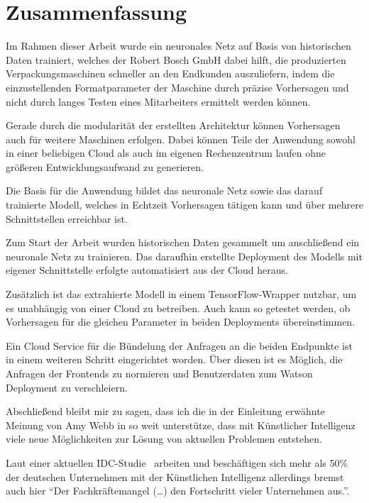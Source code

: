 \chapter{Zusammenfassung}
\label{ch:zusammenfassung}
Im Rahmen dieser Arbeit wurde ein neuronales Netz auf Basis von historischen Daten trainiert, welches der Robert Bosch
GmbH dabei hilft, die produzierten Verpackungsmaschinen schneller an den Endkunden auszuliefern, indem die
einzustellenden Formatparameter der Maschine durch präzise Vorhersagen und nicht durch langes Testen eines Mitarbeiters
ermittelt werden können.

Gerade durch die modularität der erstellten Architektur können Vorhersagen auch für weitere Maschinen erfolgen. Dabei
können Teile der Anwendung sowohl in einer beliebigen Cloud als auch im eigenen Rechenzentrum laufen ohne größeren
Entwicklungsaufwand zu generieren.

Die Basis für die Anwendung bildet das neuronale Netz sowie das darauf trainierte Modell, welches in Echtzeit Vorhersagen
tätigen kann und über mehrere Schnittstellen erreichbar ist.

Zum Start der Arbeit wurden historischen Daten gesammelt um anschließend ein neuronale Netz zu trainieren. Das daraufhin
erstellte Deployment des Modells mit eigener Schnittstelle erfolgte automatisiert aus der Cloud heraus.

Zusätzlich ist das extrahierte Modell in einem TensorFlow-Wrapper nutzbar, um es unabhängig von einer Cloud zu
betreiben. Auch kann so getestet werden, ob Vorhersagen für die gleichen Parameter in beiden Deployments übereinstimmen.

Ein Cloud Service für die Bündelung der Anfragen an die beiden Endpunkte ist in einem weiteren Schritt eingerichtet
worden. Über diesen ist es Möglich, die Anfragen der Frontends zu normieren und Benutzerdaten zum Watson Deployment zu
verschleiern.

Abschließend bleibt mir zu sagen, dass ich die in der Einleitung erwähnte Meinung von Amy Webb in so weit unterstütze,
dass mit Künstlicher Intelligenz viele neue Möglichkeiten zur Lösung von aktuellen Problemen entstehen.

Laut einer aktuellen IDC-Studie~\cite{article_zusammenfassung_idc} arbeiten und beschäftigen sich mehr als 50\% der
deutschen Unternehmen mit der Künstlichen Intelligenz allerdings bremst auch hier \enquote{Der Fachkräftemangel (\ldots)
den Fortschritt vieler Unternehmen aus.}.